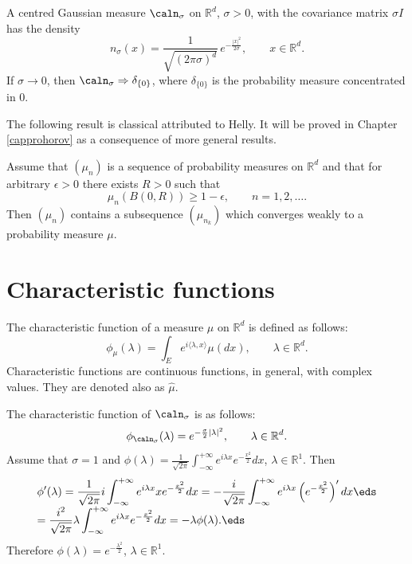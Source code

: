 \documentclass[preprint]{imsart}
\def\R{\mathbb R}
\def\ds{\displaystyle}
\begin{document}
{\begin{Example}\begin{em}
A centred Gaussian measure $\caln_\sigma$ on $\R^d$,
$\sigma >0$, with the covariance matrix $\sigma I$ has
the density
$$
n_\sigma (x)=\frac{1}{\sqrt{(2\pi \sigma)^d}}\,
e^{-\frac{|x|^2} {2\sigma}},\qquad x\in\R^d.
$$
If $\sigma\to 0$, then
$\caln_\sigma\Rightarrow\delta_{\{0\}}$, where
$\delta_{\{0\}}$ is the probability measure
concentrated in $0$.
\end{em}
\end{Example}


The following result is classical attributed to Helly.
It will be proved in Chapter \ref{capprohorov} as a consequence of more general
results.

\begin{Proposition}\label{helly}
  Assume that $(\mu_n)$ is a sequence of probability measures
  on $\R^d$ and that for arbitrary $\epsilon >0$ there exists
  $R>0$ such that
  $$
  \mu_n(B(0,R))\geq 1-\epsilon,
  \qquad n=1,2,\dots.
  $$
Then $(\mu_n)$ contains a subsequence $(\mu_{n_k})$ which
converges weakly to a probability measure $\mu$.
\end{Proposition}



\section{Characteristic functions}




The characteristic function of a
measure $\mu$ on $\R^d$ is defined as follows:
$$
\phi_\mu(\lambda)=\int_E
e^{i\langle\lambda,x\rangle} \mu(dx),\qquad
\lambda\in\R^d.
$$
Characteristic functions are continuous functions, in general, with
complex values. They are denoted also as $\widehat{\mu}$.


\begin{Example}\begin{em}
The characteristic function of  $\caln_\sigma$ is as
follows:
$$
\phi_{\caln_\sigma}(\lambda)=
e^{-\frac {\sigma}{2}|\lambda|^2},\qquad
\lambda\in\R^d.
$$
Assume that $\sigma = 1$  and  $\phi(\lambda )=
\frac{1}{\sqrt{2\pi}}\int_{-\infty}^{+\infty}e^{i\lambda
x}e^{-\frac{x^2}{2}}dx$, $\lambda \in \R^1$. Then
$$\begin{array}{l}\ds
\phi'(\lambda )=
\frac{1}{\sqrt{2\pi}}i\int_{-\infty}^{+\infty}e^{i\lambda
x}xe^{-\frac{x^2}{2}}dx
=
-\frac{i}{\sqrt{2\pi}}\int_{-\infty}^{+\infty}e^{i\lambda
x}\left(e^{-\frac{x^2}{2}}\right)'dx
\eds\\\ds
=
\frac{i^2}{\sqrt{2\pi}}\lambda\int_{-\infty}^{+\infty}e^{i\lambda
x} e^{-\frac{x^2}{2}} dx
=-\lambda \phi(\lambda ).
\eds\end{array}
$$
Therefore $\phi(\lambda )=e^{-\frac{\lambda^2}{2}}$,
$\lambda\in\R^1$.


\end{em}
\end{Example}}
\end{document}
